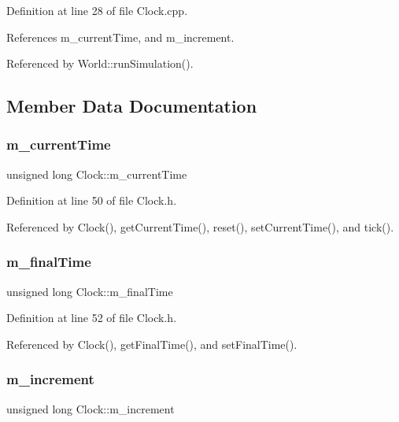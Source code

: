 Definition at line 28 of file Clock.\+cpp.



References m\+\_\+current\+Time, and m\+\_\+increment.



Referenced by World\+::run\+Simulation().



\subsection{Member Data Documentation}
\mbox{\label{class_clock_a73bf4edfc8f0fe2548ef6956f68b678e}} 
\subsubsection{m\+\_\+current\+Time}
{\footnotesize\ttfamily unsigned long Clock\+::m\+\_\+current\+Time\hspace{0.3cm}{\ttfamily [private]}}



Definition at line 50 of file Clock.\+h.



Referenced by Clock(), get\+Current\+Time(), reset(), set\+Current\+Time(), and tick().

\mbox{\label{class_clock_a5c473d84c1051d946ab5565060902840}} 
\subsubsection{m\+\_\+final\+Time}
{\footnotesize\ttfamily unsigned long Clock\+::m\+\_\+final\+Time\hspace{0.3cm}{\ttfamily [private]}}



Definition at line 52 of file Clock.\+h.



Referenced by Clock(), get\+Final\+Time(), and set\+Final\+Time().

\mbox{\label{class_clock_a2f940f0a30d58d1f7f36d0296463b9aa}} 
\subsubsection{m\+\_\+increment}
{\footnotesize\ttfamily unsigned long Clock\+::m\+\_\+increment\hspace{0.3cm}{\ttfamily [private]}}




